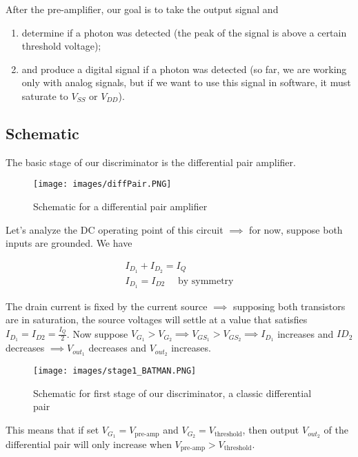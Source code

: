\documentclass[a4paper,12pt,twoside]{article}
\begin{document}
	After the pre-amplifier, our goal is to take the output signal and
	\begin{enumerate}
		\item determine if a photon was detected (the peak of the signal is above a certain threshold voltage);
		\item and produce a digital signal if a photon was detected (so far, we are working only with analog signals, but if we want to use this signal in software, it must saturate to $V_{SS}$ or $V_{DD}$).
	\end{enumerate}
	
	\subsection{Schematic}
	
	The basic stage of our discriminator is the differential pair amplifier.
	
	\begin{figure}[h!]
		\centering
		\texttt{[image: images/diffPair.PNG]}
		\label{diffPair}
		\caption{Schematic for a differential pair amplifier\cite{CurrentS}}
	\end{figure}
	
	Let's analyze the DC operating point of this circuit $\implies$ for now, suppose both inputs are grounded. We have
	
	\begin{align}
		I_{D_1} + I_{D_2} = I_Q \\
		I_{D_1} = I_{D2} \quad \text{ by symmetry}
	\end{align}
	
	The drain current is fixed by the current source $\implies$ supposing both transistors are in saturation, the source voltages will settle at a value that satisfies $I_{D_1} = I_{D2} = \frac{I_Q}{2}$. Now suppose $V_{G_1} > V_{G_2} \implies V_{GS_1} > V_{GS_2} \implies I_{D_1}$ increases and $I{D_2}$ decreases $\implies V_{out_1}$ decreases and $V_{out_2}$ increases.
	
	\begin{figure}[h!]
		\centering
		\texttt{[image: images/stage1\_BATMAN.PNG]}
		\label{diffPairBATMAN}
		\caption{Schematic for first stage of our discriminator, a classic differential pair}
	\end{figure}
	
	This means that if set $V_{G_1} = V_{\text{pre-amp}}$ and $V_{G_2} = V_{\text{threshold}}$, then output $V_{out_2}$ of the differential pair will only increase when $V_{\text{pre-amp}} > V_{\text{threshold}}$.
	
\end{document}
